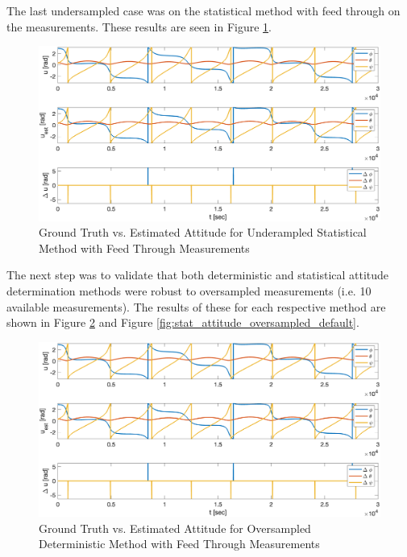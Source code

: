 The last undersampled case was on the statistical method with feed through on the measurements. These results are seen in Figure \ref{fig:stat_attitude_undersampled_default}.

\begin{figure}[H]
    \centering
    \captionsetup{ justification = centering }
    \includegraphics[width = 12cm]{Images/PS6/attitude_estimation_undersampled_q_default.png}
    \caption{Ground Truth vs. Estimated Attitude for Underampled Statistical Method with Feed Through Measurements}
    \label{fig:stat_attitude_undersampled_default}
\end{figure}

The next step was to validate that both deterministic and statistical attitude determination methods were robust to oversampled measurements (i.e. 10 available measurements). The results of these for each respective method are shown in Figure \ref{fig:det_attitude_oversampled_default} and Figure \ref{fig:stat_attitude_oversampled_default}. 

\begin{figure}[H]
    \centering
    \includegraphics[width = 12cm]{Images/PS6/attitude_estimation_oversampled_det_default.png}
    \caption{Ground Truth vs. Estimated Attitude for Oversampled Deterministic Method with Feed Through Measurements}
    \label{fig:det_attitude_oversampled_default}
\end{figure}

